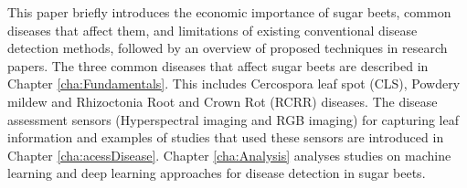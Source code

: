  This paper briefly introduces the economic importance of sugar beets, common diseases that affect them, and limitations of existing conventional disease detection methods, followed by an overview of proposed techniques in research papers. The three common diseases that affect sugar beets are described in Chapter \ref{cha:Fundamentals}.  This includes Cercospora leaf spot (CLS), Powdery mildew and Rhizoctonia Root and Crown Rot (RCRR) diseases. The disease assessment sensors (Hyperspectral imaging and RGB imaging) for capturing leaf information and examples of studies that used these sensors are introduced in Chapter \ref{cha:acessDisease}. Chapter \ref{cha:Analysis} analyses studies on machine learning and deep learning approaches for disease detection in sugar beets. 








